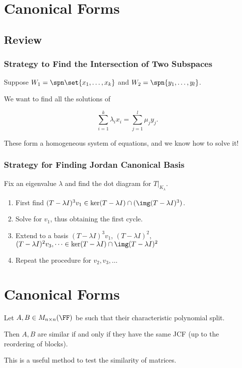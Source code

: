\documentclass[11pt]{scrartcl}
\begin{document}
\section{Canonical Forms}

\subsection{Review}
\subsubsection{Strategy to Find the Intersection of Two Subspaces}

Suppose $W_1 = \spn \set{x_1, \dots, x_k}$ and $W_2= \spn{y_1,\dots, y_l}$.

We want to find all the solutions of 

\begin{equation*}
\sum_{i=1}^k\lambda_ix_i = \sum_{j=1}^l\mu_{j}y_j.
\end{equation*}

These form a homogeneous system of equations, and we know how to solve it!

\subsubsection{Strategy for Finding Jordan Canonical Basis}

Fix an eigenvalue $\lambda$ and find the dot diagram for $T|_{K_{\lambda}}$.

\begin{enumerate}
\item\label{item:1} First find $(T-\lambda I)^3v_1\in \ker(T-\lambda I)\cap (\img (T-\lambda I)^3)$.
\item Solve for $v_1$, thus obtaining the first cycle.
\item Extend to a basis $(T-\lambda I)^3v_1$, $(T-\lambda I)^2$,
  $(T-\lambda I)^2v_3, \dots \in \ker (T-\lambda I)\cap \img(T-\lambda
  I)^2$
\item Repeat the procedure for $v_2, v_3, \dots $
\end{enumerate}

\section{Canonical Forms}

\begin{theorem}
Let $A, B \in M_{n\times n}(\FF)$  be such that their characteristic polynomial split.

Then $A, B$ are similar if and only if they have the same JCF (up to the reordering of blocks).
\end{theorem}
\begin{remark}
This is a useful method to test the similarity of matrices.
\end{remark}
\end{document}
